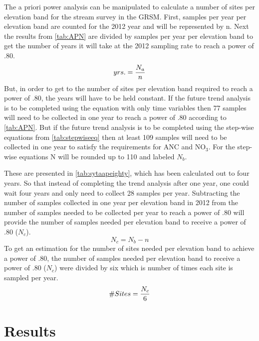 The a priori power analysis can be manipulated to calculate a number of sites per elevation band for the stream survey in the GRSM.
First, samples per year per elevation band are counted for the 2012 year and will be represented by n.
Next the results from \autoref{tab:APN} are divided by samples per year per elevation band to get the number of years it will take at the 2012 sampling rate to reach a power of .80.
\begin{equation} \label{eq:yrs}
	yrs. = {N_a \over n}
\end{equation}
But, in order to get to the number of sites per elevation band required to reach a power of .80, the years will have to be held constant.
If the future trend analysis is to be completed using the equation with only time variables then 77 samples will need to be collected in one year to reach a power of .80 according to \autoref{tab:APN}.
But if the future trend analysis is to be completed using the step-wise equations from \autoref{tab:stepwiseeq} then at least 109 samples will need to be collected in one year to satisfy the requirements for ANC and NO$_3$.
For the step-wise equations N will be rounded up to 110 and labeled $N_b$.

These are presented in \autoref{tab:sytaapeighty}, which has been calculated out to four years.
So that instead of completing the trend analysis after one year, one could wait four years and only need to collect 28 samples per year.
Subtracting the number of samples collected in one year per elevation band in 2012 from the number of samples needed to be collected per year to reach a power of .80 will provide the number of samples needed per elevation band to receive a power of .80 ($N_c$).
\begin{equation} \label{eq:Nc}
	N_c={N_b - n}
\end{equation}
To get an estimation for the number of sites needed per elevation band to achieve a power of .80, the number of samples needed per elevation band to receive a power of .80 ($N_c$) were divided by six which is number of times each site is sampled per year.
\begin{equation}\label{eq:sites}
	\#Sites = {N_c \over 6}
\end{equation}

\section{Results}
